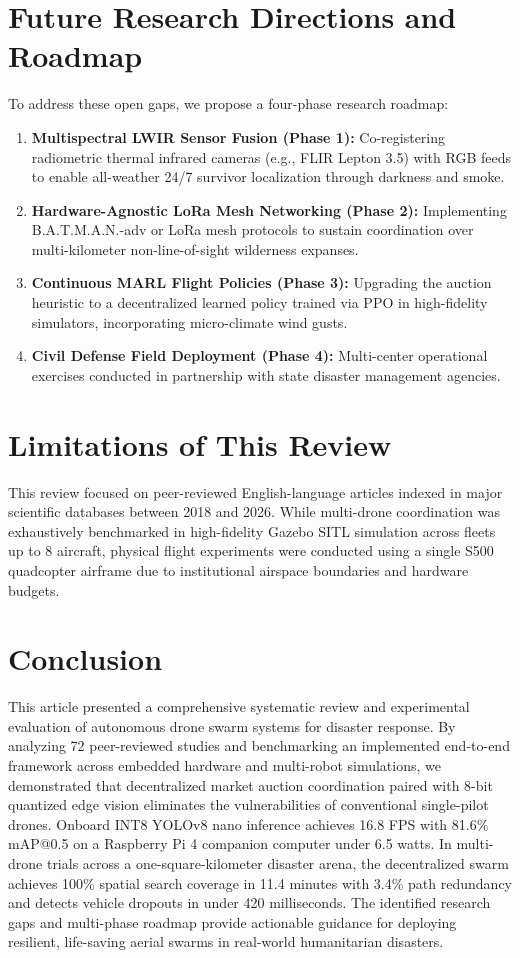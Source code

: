 \documentclass[journal]{IEEEtran}
\begin{document}
\section{Future Research Directions and Roadmap}
To address these open gaps, we propose a four-phase research roadmap:
\begin{enumerate}
    \item \textbf{Multispectral LWIR Sensor Fusion (Phase 1):} Co-registering radiometric thermal infrared cameras (e.g., FLIR Lepton 3.5) with RGB feeds to enable all-weather 24/7 survivor localization through darkness and smoke.
    \item \textbf{Hardware-Agnostic LoRa Mesh Networking (Phase 2):} Implementing B.A.T.M.A.N.-adv or LoRa mesh protocols to sustain coordination over multi-kilometer non-line-of-sight wilderness expanses.
    \item \textbf{Continuous MARL Flight Policies (Phase 3):} Upgrading the auction heuristic to a decentralized learned policy trained via PPO in high-fidelity simulators, incorporating micro-climate wind gusts.
    \item \textbf{Civil Defense Field Deployment (Phase 4):} Multi-center operational exercises conducted in partnership with state disaster management agencies.
\end{enumerate}

\section{Limitations of This Review}
This review focused on peer-reviewed English-language articles indexed in major scientific databases between 2018 and 2026. While multi-drone coordination was exhaustively benchmarked in high-fidelity Gazebo SITL simulation across fleets up to 8 aircraft, physical flight experiments were conducted using a single S500 quadcopter airframe due to institutional airspace boundaries and hardware budgets.

\section{Conclusion}
This article presented a comprehensive systematic review and experimental evaluation of autonomous drone swarm systems for disaster response. By analyzing 72 peer-reviewed studies and benchmarking an implemented end-to-end framework across embedded hardware and multi-robot simulations, we demonstrated that decentralized market auction coordination paired with 8-bit quantized edge vision eliminates the vulnerabilities of conventional single-pilot drones. Onboard INT8 YOLOv8 nano inference achieves 16.8 FPS with 81.6\% mAP@0.5 on a Raspberry Pi 4 companion computer under 6.5 watts. In multi-drone trials across a one-square-kilometer disaster arena, the decentralized swarm achieves 100\% spatial search coverage in 11.4 minutes with 3.4\% path redundancy and detects vehicle dropouts in under 420 milliseconds. The identified research gaps and multi-phase roadmap provide actionable guidance for deploying resilient, life-saving aerial swarms in real-world humanitarian disasters.
\end{document}
